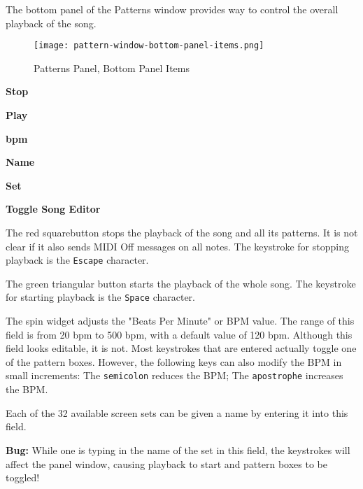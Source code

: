    The bottom panel of the Patterns window provides way to control the
   overall playback of the song.

\begin{figure}[H]
   \centering 
   \texttt{[image: pattern-window-bottom-panel-items.png]}
   \caption{Patterns Panel, Bottom Panel Items}
   \label{fig:pattern_window_bottom_panel_items}
\end{figure}

   \begin{enumber}
      \item \textbf{Stop}
      \item \textbf{Play}
      \item \textbf{bpm}
      \item \textbf{Name}
      \item \textbf{Set}
      \item \textbf{Toggle Song Editor}
   \end{enumber}

   \setcounter{ItemCounter}{0}      %

   The red squarebutton stops the playback of the song and all its patterns.
   It is not clear if it also sends MIDI Off messages on all notes.
   The keystroke for stopping playback is the \texttt{Escape} character.

   The green triangular button starts the playback of the whole song.
   The keystroke for starting playback is the \texttt{Space} character.

   The spin widget adjusts the "Beats Per Minute" or BPM value.  The
   range of this field is from 20 bpm to 500 bpm, with a default value of
   120 bpm.
   Although this field looks editable, it is not.  Most keystrokes
   that are entered actually toggle one of the pattern boxes.
   However, the following keys can also modify the BPM in small increments:
    The \texttt{semicolon} reduces the BPM;
    The \texttt{apostrophe} increases the BPM.

   Each of the 32 available screen sets can be given a name by entering it
   into this field.

   \textbf{Bug:}
   While one is typing in the name of the set in this field, the keystrokes
   will affect the panel window, causing playback to start and pattern
   boxes to be toggled!

